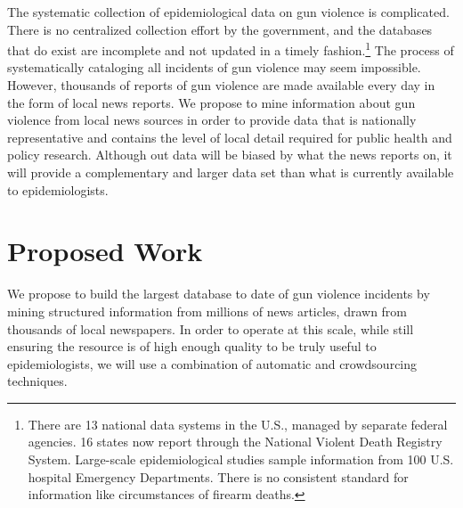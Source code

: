 \documentclass[11pt]{article}
\begin{document}
The systematic collection of epidemiological data on gun violence is complicated.  There is no centralized collection effort by the government, and the databases that do exist are incomplete and not updated in a timely fashion.\footnote{
There are 13 national data systems in the U.S., managed by separate federal agencies. 16 states now report through the National Violent Death Registry System.  Large-scale epidemiological studies sample information from 100 U.S. hospital Emergency Departments.   There is no consistent standard for information like circumstances of firearm deaths.
}
The process of systematically cataloging all incidents of gun violence may seem impossible.  However, thousands of reports of gun violence are made available every day in the form of local news reports.  We propose to mine information about gun violence from local news sources in order to provide data that is nationally representative  and contains the level of local detail required for public health and policy research.  Although out data will be biased by what the news reports on, it will provide a complementary and larger data set than what is currently available to epidemiologists.

\section{Proposed Work}

We propose to build the largest database to date of gun violence incidents by mining structured information from millions of news articles, drawn from thousands of local newspapers. In order to operate at this scale, while still ensuring the resource is of high enough quality to be truly useful to epidemiologists, we will use a combination of automatic and crowdsourcing techniques. 
\end{document}
